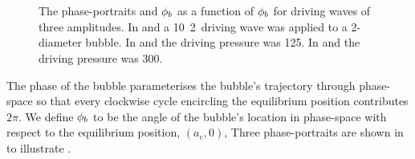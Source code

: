 \begin{figure}
  \centering
  \quad
  \\
  \qquad
  \\
  \qquad
   \caption{ 
The phase-portraits and ${\phi_b}$ as a function of ${\phi_b}$ for driving waves of three amplitudes.
In  and  a \unit{10}\kilo\pascal\, \unit{2}\mega\hertz\ driving wave
was applied to a \unit{2}\micro\metre-diameter bubble.
In  and  the driving pressure was  \unit{125}\kilo\pascal.
In  and  the driving pressure was  \unit{300}\kilo\pascal.
%
  }
  \label{fig:Phases}
\end{figure}
The phase of the bubble parameterises the bubble's trajectory through phase-space
so that every clockwise cycle  encircling the equilibrium position contributes $2\pi$.
We define ${\phi_b}$ to be the angle of the bubble's location in phase-space  with respect to the equilibrium position, $(a_e,0)$,
Three phase-portraits are shown in  to illustrate  .


